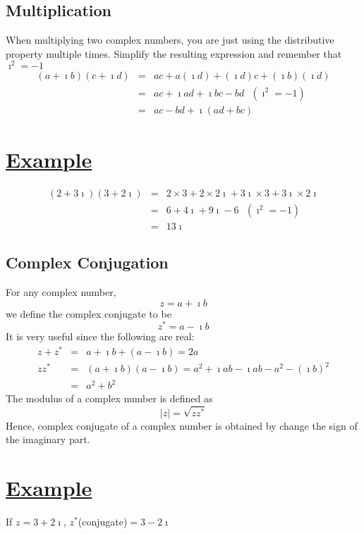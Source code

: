 \documentclass[12pt]{report}
\newcommand{\ubt}[1]{\textbf{\underline{#1}}}
\newcommand{\sps}{\\[0.2cm]}
\newcommand{\imaginary}{\imath}
\newcommand{\example}[1]{\section*{\ubt{Example #1}}}
\begin{document}
	\subsection{Multiplication}
	When multiplying two complex numbers, you are just using the distributive property multiple times. Simplify the resulting expression and remember that $\imaginary^2 = -1$
	\begin{eqnarray*}
		(a+\imaginary b)(c+\imaginary d) &=& ac + a(\imaginary d)+(\imaginary d)c + (\imaginary b)(\imaginary d)\\
		&=& ac + \imaginary ad + \imaginary bc - bd ~~~ (\imaginary^2 = -1)\\
		&=& ac - bd + \imaginary(ad + bc)
	\end{eqnarray*}
	\example{}
	\begin{eqnarray*}
		(2+3\imaginary)(3+2\imaginary) &=& 2\times 3 + 2\times 2\imaginary + 3\imaginary\times 3 + 3\imaginary \times 2\imaginary\\
		&=&6 + 4\imaginary + 9\imaginary - 6 ~~~ (\imaginary^2 = -1)\\
		&=&13\imaginary
	\end{eqnarray*}
	
	\subsection{Complex Conjugation}
	For any complex number,
	\begin{equation}
		z=a+\imaginary b\label{eq:1_13}
	\end{equation}
	we define the complex conjugate to be
	\begin{equation}
		z^{*} = a-\imaginary b\label{eq:1_14}
	\end{equation}
	It is very useful since the following are real:
	\begin{eqnarray*}
		z+z^{*}&=&a+\imaginary b + (a-\imaginary b) = 2a\sps
		zz^{*} &=&(a+\imaginary b)(a-\imaginary b) = a^2 + \imaginary ab - \imaginary ab - a^2 - (\imaginary b)^2\\
		&=& a^2 + b^2
	\end{eqnarray*}
	The modulus of a complex number is defined as 
	\begin{equation}
		|z| = \sqrt{zz^{*}}
	\end{equation}
	Hence, complex conjugate of a complex number is obtained by change the sign of the imaginary part.
	\example{}
	If $z=3+2\imaginary$, $z^{*}$(conjugate)$=3-2\imaginary$
	
\end{document}
